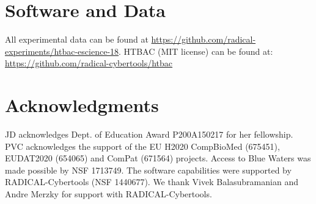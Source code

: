 \documentclass[conference]{IEEEtran}
\begin{document}
\section*{Software and Data}
All experimental data can be found at
\url{https://github.com/radical-experiments/htbac-escience-18}. HTBAC (MIT
license) can be found at: \url{https://github.com/radical-cybertools/htbac}

\section*{Acknowledgments}
JD acknowledges Dept. of Education Award P200A150217 for her
fellowship. PVC acknowledges the support of the EU H2020 CompBioMed (675451),
EUDAT2020 (654065) and ComPat (671564) projects. Access to Blue Waters was
made possible by NSF 1713749. The software capabilities were supported by
RADICAL-Cybertools (NSF 1440677). We thank Vivek Balasubramanian and Andre
Merzky for support with RADICAL-Cybertools.




\end{document}
